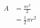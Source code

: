\documentclass{report}
\begin{document}
\begin{equation}
\begin{split}
A & = \frac{\pi r^2}{2} \\
  & = \frac{1}{2} \pi r^2
\end{split}
\end{equation}
\end{document}
